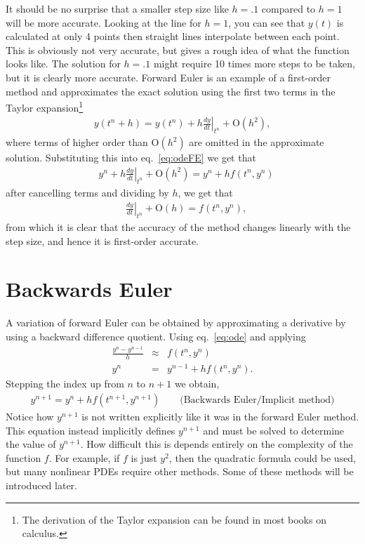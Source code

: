 It should be no surprise that a smaller step size like $h=.1$ compared to $h=1$ will be more accurate. Looking at the line for $h=1$, you can see that $y(t)$ is calculated at only 4 points then straight lines interpolate between each point. This is obviously not very accurate, but gives a rough idea of what the function looks like. The solution for $h=.1$ might require 10 times more steps to be taken, but it is clearly more accurate. Forward Euler is an example of a first-order method and approximates the exact solution using the first two terms in the Taylor expansion\footnote{The derivation of the Taylor expansion can be found in most books on calculus.}
\begin{eqnarray}
y(t^n+h)=y(t^n)+h \left.\frac{dy}{dt}\right|_{t^n}+\text{O}(h^2),
\end{eqnarray}
where terms of higher order than O$(h^2)$ are omitted in the approximate solution. Substituting this into eq.\ \eqref{eq:odeFE} we get that
\begin{align*}
&{} y^n +h \left.\frac{dy}{dt}\right|_{t^n}+\text{O}(h^2) = y^n +hf(t^n,y^n)
\end{align*}
after cancelling terms and dividing by $h$, we get that
\begin{align*}
&{} \left.\frac{dy}{dt}\right|_{t^n}+\text{O}(h) = f(t^n,y^n),
\end{align*}
from which it is clear that the accuracy of the method changes linearly with the step size, and hence it is first-order accurate.
\section{Backwards Euler}
A variation of forward Euler can be obtained by approximating a derivative by using a backward difference quotient. Using eq.\ \eqref{eq:ode} and applying
\begin{eqnarray}
\frac{y^{n}-y^{n-1}}{h}&\approx&f(t^n,y^n) \\
y^{n}&=&y^{n-1}+h f(t^n,y^n).
\end{eqnarray}
Stepping the index up from $n$ to $n+1$ we obtain,
\begin{eqnarray}
y^{n+1}=y^n+h f(t^{n+1},y^{n+1})\qquad \text{(Backwards Euler/Implicit method)}
\end{eqnarray}
Notice how $y^{n+1}$ is not written explicitly like it was in the forward Euler method. This equation instead implicitly defines $y^{n+1}$ and must be solved  to determine the value of $y^{n+1}$. How difficult this is depends entirely on the complexity of the function $f$. For example, if $f$ is just $y^2$, then the quadratic formula could be used, but many nonlinear PDEs require other methods. Some of these methods will be introduced later.
